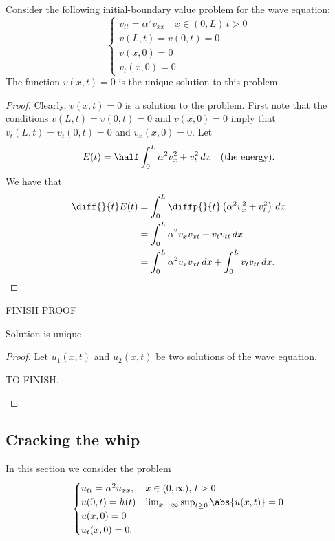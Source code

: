 \documentclass[12pt, a4paper]{article}
\begin{document}
\begin{mdthm}
    Consider the following initial-boundary value problem for the wave equation:
    \[\begin{cases}
        v_{tt}=\alpha^2 v_{xx} \quad x\in(0,L) \, t>0 \\
        v(L,t)=v(0,t)=0 \\
        v(x,0)=0\\
        v_t(x,0)=0.
   \end{cases}\]
   The function \(v(x,t) =0\) is the unique solution to this problem.
\end{mdthm}

\begin{proof}
    Clearly, \(v(x,t)=0\) is a solution to the problem. First note that the conditions \(v(L,t)=v(0,t)=0\) and \(v(x,0)=0\) imply that \(v_t(L,t)=v_t(0,t)=0\) and \(v_x(x,0)=0\). Let 
    \[E(t) = \half \int_0^L \alpha^2 v_x^2 +v_t^2 \, dx \quad (\text{the energy}).\]
    We have that 
    \[\begin{aligned}
        \diff{}{t}E(t) &= \int_0^L \diffp{}{t} \left( \alpha^2 v_x^2 +v_t^2 \right) \, dx \\
        &= \int_0^L \alpha^2 v_x v_{xt}+v_t v_{tt} \, dx \\
        &=\int_0^L \alpha^2 v_x v_{xt} \, dx + \int_0^L v_t v_{tt} \, dx.
    \end{aligned}\]
\end{proof}

\begin{mdthm}
    FINISH PROOF
\end{mdthm}

\begin{mdthm}
    Solution is unique 
\end{mdthm}

\begin{proof}
    Let \(u_1(x,t)\) and \(u_2(x,t)\) be two solutions of the wave equation. 
    \begin{mdthm}
        TO FINISH.
    \end{mdthm}
\end{proof}

\subsection{Cracking the whip}

In this section we consider the problem 
\[\begin{cases}
    u_{tt} = \alpha^2 u_{xx} , & x \in (0,\infty), \, t>0 \\
    u(0,t)=h(t) & \lim_{x\to\infty} \sup_{t \geq 0} \abs{u(x,t)}=0\\
    u(x,0)=0 \\
    u_t(x,0)=0.
\end{cases}\]
\end{document}
